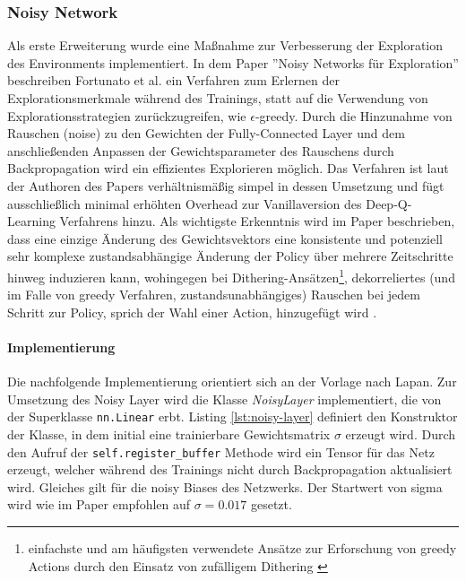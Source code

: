 \documentclass[11pt]{scrartcl}
\begin{document}
\subsubsection{Noisy Network}
Als erste Erweiterung wurde eine Maßnahme zur Verbesserung der Exploration des Environments implementiert.
In dem Paper ''Noisy Networks für Exploration'' beschreiben Fortunato et al.\cite[~S.1 f.]{FAPMOGM2017}
ein Verfahren zum Erlernen der Explorationsmerkmale während des Trainings, statt auf die Verwendung von
Explorationsstrategien zurückzugreifen, wie $\epsilon$-greedy. Durch die Hinzunahme von Rauschen (noise)
zu den Gewichten der Fully-Connected Layer und dem anschließenden Anpassen der Gewichtsparameter des
Rauschens durch Backpropagation wird ein effizientes Explorieren möglich. Das Verfahren ist laut der
Authoren des Papers verhältnismäßig simpel in dessen Umsetzung und fügt ausschließlich minimal erhöhten
Overhead zur Vanillaversion des Deep-Q-Learning Verfahrens hinzu. Als wichtigste Erkenntnis wird im Paper
beschrieben, dass eine einzige Änderung des Gewichtsvektors eine konsistente und potenziell sehr komplexe
zustandsabhängige Änderung der Policy über mehrere Zeitschritte hinweg induzieren kann, wohingegen bei
Dithering-Ansätzen\footnote{einfachste und am häufigsten verwendete Ansätze zur Erforschung von greedy
Actions durch den Einsatz von zufälligem Dithering \cite[~S.2]{R2004}}, dekorreliertes (und im Falle von
greedy Verfahren, zustandsunabhängiges) Rauschen bei jedem Schritt zur Policy, sprich der Wahl einer
Action, hinzugefügt wird \cite[~S.2]{FAPMOGM2017}. 

\paragraph*{Implementierung}
\noindent
\newline
Die nachfolgende Implementierung orientiert sich an der Vorlage nach Lapan\cite[~S.179]{L2018}.
Zur Umsetzung des Noisy Layer wird die Klasse \textit{NoisyLayer} implementiert, die von der
Superklasse \lstinline!nn.Linear! erbt. Listing \ref{lst:noisy-layer} definiert den Konstruktor
der Klasse, in dem initial eine trainierbare Gewichtsmatrix $\sigma$ erzeugt wird. Durch den
Aufruf der \lstinline!self.register_buffer! Methode wird ein Tensor für das Netz erzeugt, welcher
während des Trainings nicht durch Backpropagation aktualisiert wird. Gleiches gilt für die noisy
Biases des Netzwerks. Der Startwert von sigma wird wie im Paper empfohlen \cite[~S.6]{FAPMOGM2017}
auf $\sigma=0.017$ gesetzt.
\end{document}
